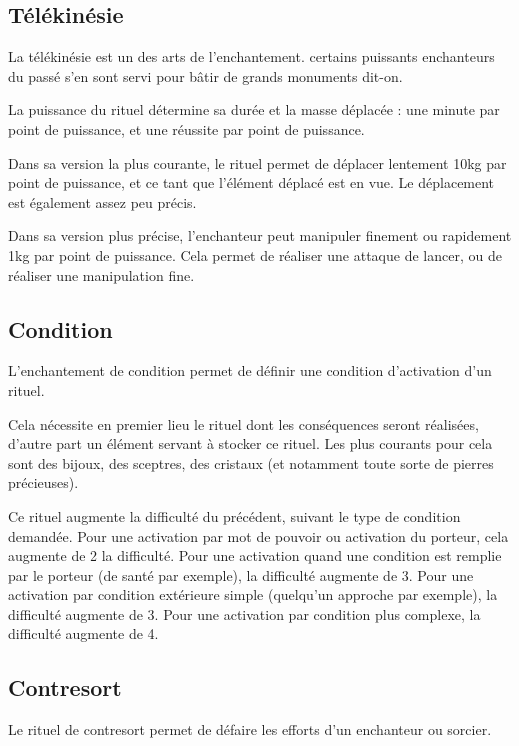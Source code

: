 \documentclass[10pt,a4paper,twocolumn]{book}
\begin{document}
\subsection*{Télékinésie}
La télékinésie est un des arts de l'enchantement. certains puissants enchanteurs du passé s'en sont servi pour bâtir de grands monuments dit-on.

La puissance du rituel détermine sa durée et la masse déplacée : une minute par point de puissance, et une réussite par point de puissance.

Dans sa version la plus courante, le rituel permet de déplacer lentement 10kg par point de puissance, et ce tant que l'élément déplacé est en vue. Le déplacement est également assez peu précis.

Dans sa version plus précise, l'enchanteur peut manipuler finement ou rapidement 1kg par point de puissance. Cela permet de réaliser une attaque de lancer, ou de réaliser une manipulation fine.
\subsection*{Condition}
L'enchantement de condition permet de définir une condition d'activation d'un rituel. 

Cela nécessite en premier lieu le rituel dont les conséquences seront réalisées, d'autre part un élément servant à stocker ce rituel. Les plus courants pour cela sont des bijoux, des sceptres, des cristaux (et notamment toute sorte de pierres précieuses).

Ce rituel augmente la difficulté du précédent, suivant le type de condition demandée. Pour une activation par mot de pouvoir ou activation du porteur, cela augmente de 2 la difficulté. Pour une activation quand une condition est remplie par le porteur (de santé par exemple), la difficulté augmente de 3. Pour une activation par condition extérieure simple (quelqu'un approche par exemple), la difficulté augmente de 3. Pour une activation par condition plus complexe, la difficulté augmente de 4.
\subsection*{Contresort}
Le rituel de contresort permet de défaire les efforts d'un enchanteur ou sorcier.
\end{document}

